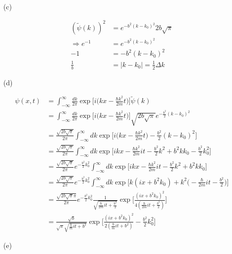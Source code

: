 \documentclass[11pt,a4paper]{article}
\begin{document}
\begin{enumerate}
\item[(c)]

\begin{align}
    (\tilde{\psi}(k))^2&=e^{-b^2(k-k_0)^2}2b\sqrt{\pi}\\
    \Rightarrow e^{-1}&=e^{-b^2(k-k_0)^2}\\
    -1&=-b^2(k-k_0)^2\\
    \frac{1}{b}&=|k-k_0|=\frac{1}{2}\Delta k
\end{align}

\item[(d)]

\begin{align}
    \psi(x,t)
    &=\int^\infty_{-\infty} \frac{dk}{2\pi}\exp{\bigg[i\Big(kx-\frac{\hbar k^2}{2m}t\Big)\bigg]}\tilde{\psi}(k)\\
    &=\int^\infty_{-\infty} \frac{dk}{2\pi}\exp{\bigg[i\Big(kx-\frac{\hbar k^2}{2m}t\Big)\bigg]}\sqrt{2b\sqrt{\pi}}e^{-\frac{b^2}{2}(k-k_0)^2}\\
    &=\frac{\sqrt{2b\sqrt{\pi}}}{2\pi}\int^\infty_{-\infty} dk\exp{\bigg[i\Big(kx-\frac{\hbar k^2}{2m}t\Big)-\frac{b^2}{2}(k-k_0)^2\bigg]}\\
    &=\frac{\sqrt{2b\sqrt{\pi}}}{2\pi}\int^\infty_{-\infty} dk\exp{\bigg[ikx-\frac{\hbar k^2}{2m}it-\frac{b^2}{2}k^2+b^2kk_0-\frac{b^2}{2}k_0^2\bigg]}\\
    &=\frac{\sqrt{2b\sqrt{\pi}}}{2\pi}e^{-\frac{b^2}{2}k_0^2}\int^\infty_{-\infty} dk\exp{\bigg[ikx-\frac{\hbar k^2}{2m}it-\frac{b^2}{2}k^2+b^2kk_0\bigg]}\\
    &=\frac{\sqrt{2b\sqrt{\pi}}}{2\pi}e^{-\frac{b^2}{2}k_0^2}\int^\infty_{-\infty} dk\exp{\bigg[k(ix+b^2k_0)+k^2\Big(-\frac{\hbar}{2m}it-\frac{b^2}{2}\Big)\bigg]}\\
    &=\frac{\sqrt{2b\sqrt{\pi}\pi}}{2\pi}e^{-\frac{b^2}{2}k_0^2}\frac{1}{\sqrt{\frac{\hbar}{2m}it+\frac{b^2}{2}}}\exp{\bigg[\frac{(ix+b^2k_0)^2}{4(\frac{\hbar}{2m}it+\frac{b^2}{2})}\bigg]}\\
    &=\frac{\sqrt{b}}{\sqrt{\pi}\sqrt{\frac{\hbar}{m}it+b^2}}\exp{\bigg[\frac{(ix+b^2k_0)^2}{2(\frac{\hbar}{m}it+b^2)}-\frac{b^2}{2}k_0^2\bigg]}
\end{align}

\item[(e)]

\end{enumerate}
\end{document}
